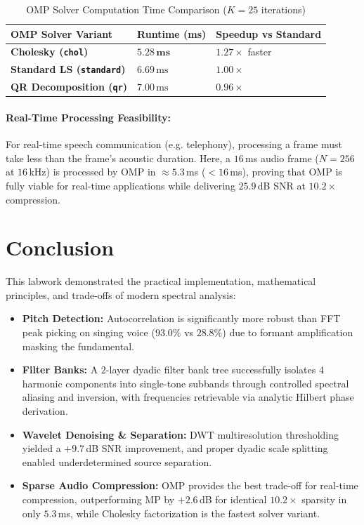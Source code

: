 \documentclass{rapportCS}
\begin{document}
\begin{table}[H]
    \centering
    \caption{OMP Solver Computation Time Comparison ($K=25$ iterations)}
    \label{tab:omp_solvers}
    \begin{tabularx}{0.7\textwidth}{lXX}
        \toprule
        \textbf{OMP Solver Variant} & \textbf{Runtime (ms)} & \textbf{Speedup vs Standard} \\
        \midrule
        \textbf{Cholesky (\texttt{chol})} & $\mathbf{5.28\,\text{ms}}$ & $\mathbf{1.27\times}$ faster \\
        \textbf{Standard LS (\texttt{standard})} & $6.69\,\text{ms}$ & $1.00\times$ \\
        \textbf{QR Decomposition (\texttt{qr})} & $7.00\,\text{ms}$ & $0.96\times$ \\
        \bottomrule
    \end{tabularx}
\end{table}

\paragraph{Real-Time Processing Feasibility:}
For real-time speech communication (e.g. telephony), processing a frame must take less than the frame's acoustic duration. Here, a $16$\,ms audio frame ($N=256$ at $16$\,kHz) is processed by OMP in $\approx 5.3$\,ms ($< 16$\,ms), proving that OMP is fully viable for real-time applications while delivering $25.9$\,dB SNR at $10.2\times$ compression.

\section{Conclusion}

This labwork demonstrated the practical implementation, mathematical principles, and trade-offs of modern spectral analysis:
\begin{itemize}
    \item \textbf{Pitch Detection:} Autocorrelation is significantly more robust than FFT peak picking on singing voice ($93.0\%$ vs $28.8\%$) due to formant amplification masking the fundamental.
    \item \textbf{Filter Banks:} A 2-layer dyadic filter bank tree successfully isolates 4 harmonic components into single-tone subbands through controlled spectral aliasing and inversion, with frequencies retrievable via analytic Hilbert phase derivation.
    \item \textbf{Wavelet Denoising \& Separation:} DWT multiresolution thresholding yielded a $+9.7$\,dB SNR improvement, and proper dyadic scale splitting enabled underdetermined source separation.
    \item \textbf{Sparse Audio Compression:} OMP provides the best trade-off for real-time compression, outperforming MP by $+2.6$\,dB for identical $10.2\times$ sparsity in only $5.3$\,ms, while Cholesky factorization is the fastest solver variant.
\end{itemize}
\end{document}
